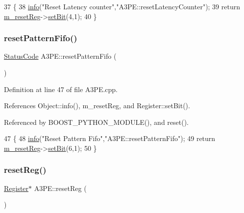 \begin{DoxyCode}
37                                     \{
38   \hyperlink{classObject_a644fd329ea4cb85f54fa6846484b84a8}{info}(\textcolor{stringliteral}{"Reset Latency counter"},\textcolor{stringliteral}{"A3PE::resetLatencyCounter"});
39   \textcolor{keywordflow}{return} \hyperlink{classA3PE_ab4db5f00976e5095686f108c8febf702}{m\_resetReg}->\hyperlink{classRegister_ab094246dd12aa7e0aa0ca917f4e70b31}{setBit}(4,1);
40 \}
\end{DoxyCode}
\mbox{\label{classA3PE_a4e5b677dd2872428abf3d64ef7a769c1}} 
\subsubsection{\texorpdfstring{reset\+Pattern\+Fifo()}{resetPatternFifo()}}
{\footnotesize\ttfamily \hyperlink{classStatusCode}{Status\+Code} A3\+P\+E\+::reset\+Pattern\+Fifo (\begin{DoxyParamCaption}{ }\end{DoxyParamCaption})}



Definition at line 47 of file A3\+P\+E.\+cpp.



References Object\+::info(), m\+\_\+reset\+Reg, and Register\+::set\+Bit().



Referenced by B\+O\+O\+S\+T\+\_\+\+P\+Y\+T\+H\+O\+N\+\_\+\+M\+O\+D\+U\+L\+E(), and reset().


\begin{DoxyCode}
47                                  \{
48   \hyperlink{classObject_a644fd329ea4cb85f54fa6846484b84a8}{info}(\textcolor{stringliteral}{"Reset Pattern Fifo"},\textcolor{stringliteral}{"A3PE::resetPatternFifo"});
49   \textcolor{keywordflow}{return} \hyperlink{classA3PE_ab4db5f00976e5095686f108c8febf702}{m\_resetReg}->\hyperlink{classRegister_ab094246dd12aa7e0aa0ca917f4e70b31}{setBit}(6,1);
50 \}
\end{DoxyCode}
\mbox{\label{classA3PE_afd34bfbfd92838717c7cdec856b2a0b2}} 
\subsubsection{\texorpdfstring{reset\+Reg()}{resetReg()}}
{\footnotesize\ttfamily \hyperlink{classRegister}{Register}$\ast$ A3\+P\+E\+::reset\+Reg (\begin{DoxyParamCaption}{ }\end{DoxyParamCaption})\hspace{0.3cm}{\ttfamily [inline]}}



